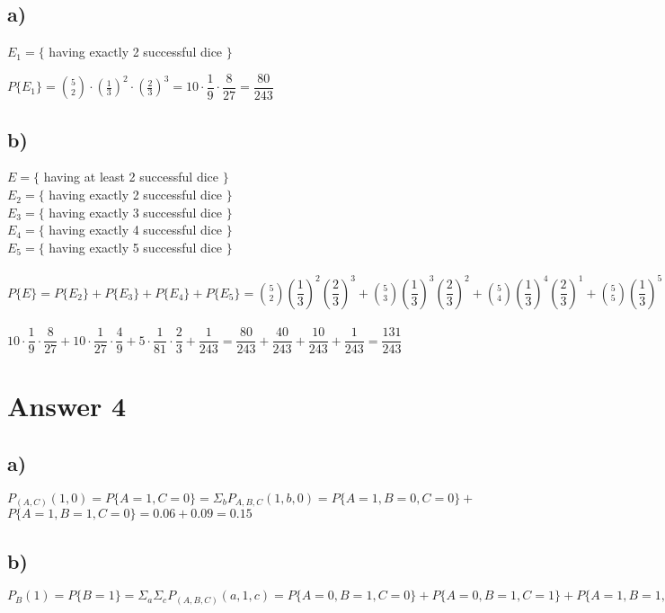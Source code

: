 \documentclass[12pt]{article}
\begin{document}
\subsection*{a)}
$E_1 = \{$ having exactly 2 successful dice $\}$ 
\begin{center}
    $P\{E_1\} = \binom{5}{2} \cdot (\frac{1}{3})^2 \cdot (\frac{2}{3})^3 = 10 \cdot \dfrac{1}{9} \cdot \dfrac{8}{27} = \dfrac{80}{243}$
\end{center}
\subsection*{b)}
$E = \{$ having at least 2 successful dice $\}$\\
$E_2 = \{$ having exactly 2 successful dice $\}$\\
$E_3 = \{$ having exactly 3 successful dice $\}$\\
$E_4 = \{$ having exactly 4 successful dice $\}$\\
$E_5 = \{$ having exactly 5 successful dice $\}$ \\ \\
    $P\{E\} = P\{E_2\} + P\{E_3\} +P\{E_4\} +P\{E_5\} =  
\binom{5}{2} (\dfrac{1}{3})^2 (\dfrac{2}{3})^3 + \binom{5}{3} (\dfrac{1}{3})^3 (\dfrac{2}{3})^2 + \binom{5}{4} (\dfrac{1}{3})^4 (\dfrac{2}{3})^1 + \binom{5}{5} (\dfrac{1}{3})^5 (\dfrac{2}{3})^0 =$ \\ \\
$ 10 \cdot \dfrac{1}{9} \cdot \dfrac{8}{27} + 10\cdot \dfrac{1}{27} \cdot \dfrac{4}{9} + 5 \cdot \dfrac{1}{81} \cdot \dfrac{2}{3} + \dfrac{1}{243} = \dfrac{80}{243} + \dfrac{40}{243} + \dfrac{10}{243} + \dfrac{1}{243} = \dfrac{131}{243}$ 

\section*{Answer 4}
\subsection*{a)}
$P_{(A, C)}(1, 0) =
P\{A = 1, C = 0\} = \Sigma_{b} P_{A, B, C} (1, b , 0) = P\{A = 1, B =0, C =0\} + $ \\ $P\{A=1, B=1 ,C=0\} = 0.06 + 0.09 = 0.15$
\subsection*{b)}
$P_{B}(1) = P\{B = 1\} = \Sigma_{a} \Sigma_{c} P_{(A, B, C)} (a, 1, c) =P\{A = 0, B=1, C=0\} + P\{A=0, B=1, C=1\}+ P\{A=1, B=1, C=0\}+ P\{A=1, B=1, C=1\} = 0.21 + 0.02 + 0.09+ 0.08 = 0.4$
\end{document}
